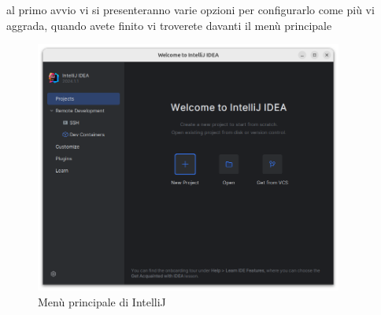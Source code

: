             al primo avvio vi si presenteranno varie opzioni per configurarlo come più vi aggrada, quando avete finito vi troverete davanti il menù principale
            \begin{figure}[H]
                \centering
                \graphicspath{{src/capitoli/04/img/}}
                \includegraphics[width=0.9\textwidth]{Intellij-menu.png}
                \caption{Menù principale di IntelliJ}
                \label{fig:Menù principale di IntelliJ}
            \end{figure}
